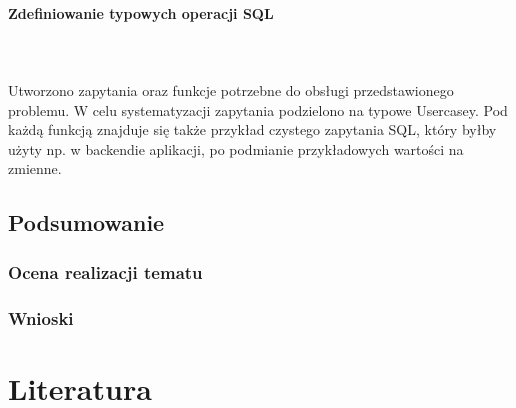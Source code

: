 \documentclass[polish, 11pt]{article}
\begin{document}
		    \paragraph{Zdefiniowanie typowych operacji SQL}\mbox{}\\\\
				Utworzono zapytania oraz funkcje potrzebne do obsługi przedstawionego problemu. W celu systematyzacji
				zapytania podzielono na typowe Usercasey. Pod każdą funkcją znajduje się także przykład czystego zapytania SQL, który byłby
				użyty np. w backendie aplikacji, po podmianie przykładowych wartości na zmienne.
				
				

    \subsection{Podsumowanie}
	    \subsubsection{Ocena realizacji tematu}
	    
		\subsubsection{Wnioski}

\section{Literatura}
\end{document}
